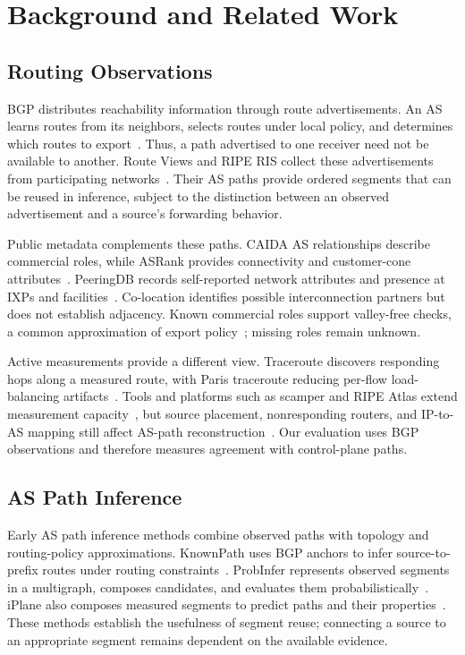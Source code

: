 \documentclass[conference]{IEEEtran}
\begin{document}
\section{Background and Related Work}
\label{sec:background}

\subsection{Routing Observations}

BGP distributes reachability information through route advertisements.
An AS learns routes from its neighbors, selects routes under local
policy, and determines which routes to export~\cite{rfc4271}. Thus, a
path advertised to one receiver need not be available to another.
Route Views and RIPE RIS collect these advertisements from participating
networks~\cite{RouteViews,RIPERIS}. Their AS paths provide ordered
segments that can be reused in inference, subject to the distinction
between an observed advertisement and a source's forwarding behavior.

Public metadata complements these paths. CAIDA AS relationships
describe commercial roles, while ASRank provides connectivity and
customer-cone attributes~\cite{caidaASRelationships,caidaASrank}.
PeeringDB records self-reported network attributes and presence at IXPs
and facilities~\cite{PeeringDB}. Co-location identifies possible
interconnection partners but does not establish adjacency. Known
commercial roles support valley-free checks, a common approximation of
export policy~\cite{gao2001inferring}; missing roles remain unknown.

Active measurements provide a different view. Traceroute discovers
responding hops along a measured route, with Paris traceroute reducing
per-flow load-balancing artifacts~\cite{tracerouteJacobson,ParisTraceroute}.
Tools and platforms such as scamper and RIPE Atlas extend measurement
capacity~\cite{scamper2010,RIPEAtlas}, but source placement,
nonresponding routers, and IP-to-AS mapping still affect AS-path
reconstruction~\cite{RIPEAtlasResultFormat,mao2003AStraceroute}.
Our evaluation uses BGP observations and therefore measures agreement
with control-plane paths.

\subsection{AS Path Inference}

Early AS path inference methods combine observed paths with topology
and routing-policy approximations. KnownPath uses BGP anchors to infer
source-to-prefix routes under routing constraints~\cite{qiu2005path}.
ProbInfer represents observed segments in a multigraph, composes
candidates, and evaluates them probabilistically~\cite{probinfer}.
iPlane also composes measured segments to predict paths and their
properties~\cite{madhyastha2006iplane,madhyastha2009iplane}. These methods
establish the usefulness of segment reuse; connecting a source to an
appropriate segment remains dependent on the available evidence.
\end{document}
